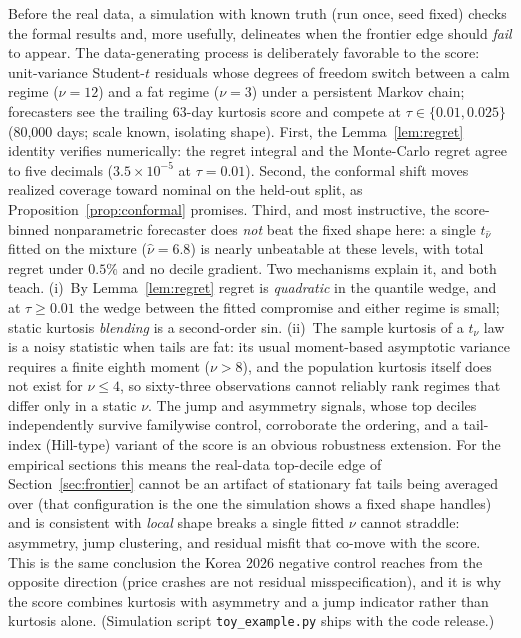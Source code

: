 \documentclass[11pt]{article}
\theoremstyle{remark}
\begin{document}
Before the real data, a simulation with known truth (run once, seed
fixed) checks the formal results and, more usefully, delineates when
the frontier edge should \emph{fail} to appear. The data-generating
process is deliberately favorable to the score: unit-variance
Student-$t$ residuals whose degrees of freedom switch between a calm
regime ($\nu=12$) and a fat regime ($\nu=3$) under a persistent Markov
chain; forecasters see the trailing 63-day kurtosis score and compete
at $\tau \in \{0.01, 0.025\}$ (80{,}000 days; scale known, isolating
shape). First, the Lemma~\ref{lem:regret} identity
verifies numerically: the regret integral and the Monte-Carlo regret
agree to five decimals ($3.5\times10^{-5}$ at $\tau=0.01$). Second, the
conformal shift moves realized coverage toward nominal on the held-out
split, as Proposition~\ref{prop:conformal} promises. Third, and most instructive, the score-binned nonparametric
forecaster does
\emph{not} beat the fixed shape here: a single $t_{\widehat\nu}$
fitted on the mixture ($\widehat\nu = 6.8$) is nearly unbeatable at
these levels, with total regret under $0.5\%$ and no decile gradient.
Two mechanisms explain it, and both teach. (i)~By
Lemma~\ref{lem:regret} regret is \emph{quadratic} in the quantile
wedge, and at $\tau \ge 0.01$ the wedge between the fitted compromise
and either regime is small; static kurtosis \emph{blending} is a
second-order sin. (ii)~The sample kurtosis of a $t_\nu$ law is a noisy statistic when
tails are fat: its usual moment-based asymptotic variance requires a
finite eighth moment ($\nu>8$), and the population kurtosis itself does
not exist for $\nu\le4$, so sixty-three observations cannot reliably
rank regimes that differ only in a static $\nu$. The jump and
asymmetry signals, whose top deciles independently survive familywise
control, corroborate the ordering, and a tail-index (Hill-type)
variant of the score is an obvious robustness extension. For the empirical sections this means the real-data top-decile edge of Section~\ref{sec:frontier}
cannot be an artifact of stationary fat tails being averaged over
(that configuration is the one the simulation shows a fixed shape
handles) and is consistent with \emph{local} shape breaks a single
fitted $\nu$ cannot straddle: asymmetry, jump clustering, and residual misfit
that co-move with the score. This is the same conclusion the Korea 2026
negative control reaches from the opposite direction (price crashes
are not residual misspecification), and it is why the score combines
kurtosis with asymmetry and a jump indicator rather than kurtosis
alone. (Simulation script \texttt{toy\_example.py} ships with the code
release.)
\end{document}
